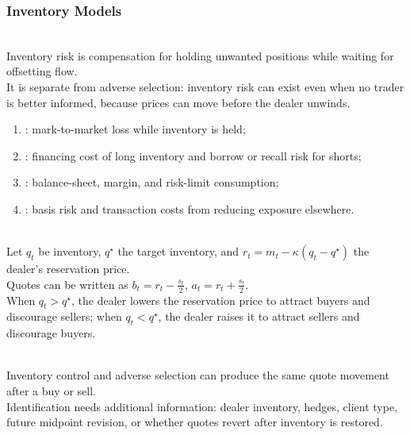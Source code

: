\subsubsection{Inventory Models}

\begin{principle} \\
Inventory risk is compensation for holding unwanted positions while waiting for offsetting flow.\\
It is separate from adverse selection: inventory risk can exist even when no trader is better informed, because prices can move before the dealer unwinds.
\end{principle}

\begin{taxonomy} 
\begin{enumerate}[label=\roman*.]
\setlength{\itemsep}{0pt}
\item {}: mark-to-market loss while inventory is held;
\item {}: financing cost of long inventory and borrow or recall risk for shorts;
\item {}: balance-sheet, margin, and risk-limit consumption;
\item {}: basis risk and transaction costs from reducing exposure elsewhere.
\end{enumerate}
\end{taxonomy}

\begin{model} \\
Let $q_t$ be inventory, $q^\star$ the target inventory, and $r_t=m_t-\kappa(q_t-q^\star)$ the dealer's reservation price.\\
Quotes can be written as $b_t=r_t-\frac{s_t}{2}$, $a_t=r_t+\frac{s_t}{2}$.\\
When $q_t>q^\star$, the dealer lowers the reservation price to attract buyers and discourage sellers; when $q_t<q^\star$, the dealer raises it to attract sellers and discourage buyers.
\end{model}

\begin{caveat} \\
Inventory control and adverse selection can produce the same quote movement after a buy or sell.\\
Identification needs additional information: dealer inventory, hedges, client type, future midpoint revision, or whether quotes revert after inventory is restored.
\end{caveat}
